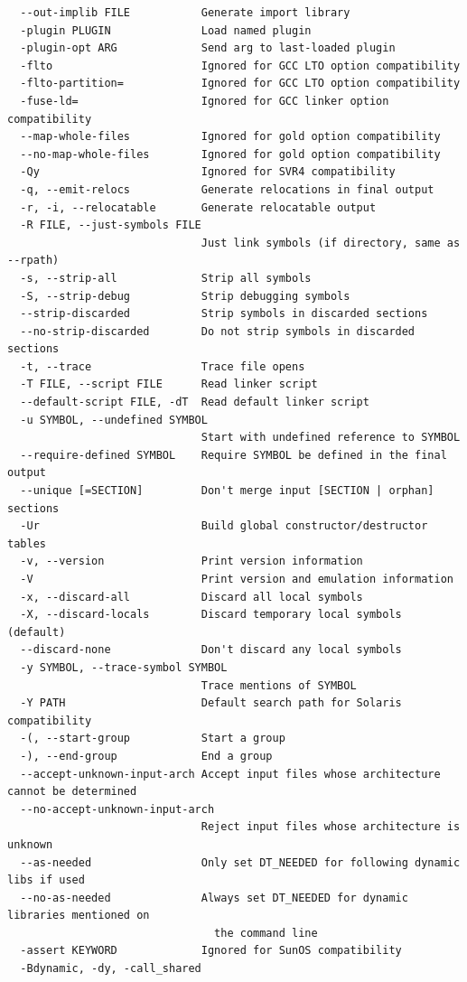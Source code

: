 \documentclass{article}
\begin{document}
\begin{lstlisting}
  --out-implib FILE           Generate import library
  -plugin PLUGIN              Load named plugin
  -plugin-opt ARG             Send arg to last-loaded plugin
  -flto                       Ignored for GCC LTO option compatibility
  -flto-partition=            Ignored for GCC LTO option compatibility
  -fuse-ld=                   Ignored for GCC linker option compatibility
  --map-whole-files           Ignored for gold option compatibility
  --no-map-whole-files        Ignored for gold option compatibility
  -Qy                         Ignored for SVR4 compatibility
  -q, --emit-relocs           Generate relocations in final output
  -r, -i, --relocatable       Generate relocatable output
  -R FILE, --just-symbols FILE
                              Just link symbols (if directory, same as --rpath)
  -s, --strip-all             Strip all symbols
  -S, --strip-debug           Strip debugging symbols
  --strip-discarded           Strip symbols in discarded sections
  --no-strip-discarded        Do not strip symbols in discarded sections
  -t, --trace                 Trace file opens
  -T FILE, --script FILE      Read linker script
  --default-script FILE, -dT  Read default linker script
  -u SYMBOL, --undefined SYMBOL
                              Start with undefined reference to SYMBOL
  --require-defined SYMBOL    Require SYMBOL be defined in the final output
  --unique [=SECTION]         Don't merge input [SECTION | orphan] sections
  -Ur                         Build global constructor/destructor tables
  -v, --version               Print version information
  -V                          Print version and emulation information
  -x, --discard-all           Discard all local symbols
  -X, --discard-locals        Discard temporary local symbols (default)
  --discard-none              Don't discard any local symbols
  -y SYMBOL, --trace-symbol SYMBOL
                              Trace mentions of SYMBOL
  -Y PATH                     Default search path for Solaris compatibility
  -(, --start-group           Start a group
  -), --end-group             End a group
  --accept-unknown-input-arch Accept input files whose architecture cannot be determined
  --no-accept-unknown-input-arch
                              Reject input files whose architecture is unknown
  --as-needed                 Only set DT_NEEDED for following dynamic libs if used
  --no-as-needed              Always set DT_NEEDED for dynamic libraries mentioned on
                                the command line
  -assert KEYWORD             Ignored for SunOS compatibility
  -Bdynamic, -dy, -call_shared

\end{lstlisting}
\end{document}
